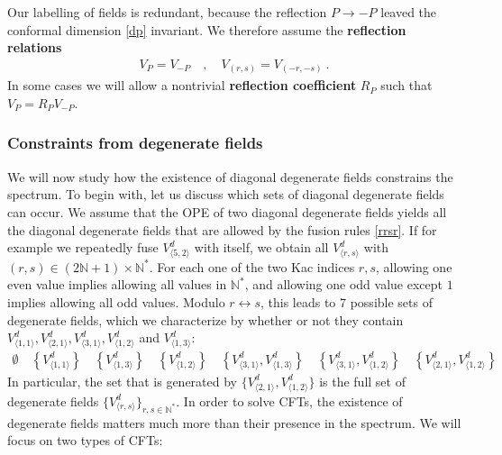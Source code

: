 \documentclass[12pt, a4paper]{article}
\theoremstyle{break}
\begin{document}
Our labelling of fields is redundant, because the reflection $P\to -P$ leaved the conformal dimension \eqref{dp} invariant. We therefore assume the \textbf{reflection relations}
\begin{align}
 V_{P} = V_{-P} \quad , \quad V_{(r,s)} = V_{(-r,-s)} \ . 
 \label{refl}
\end{align}
In some cases we will allow a nontrivial \textbf{reflection coefficient} $R_P$ such that $V_P=R_P V_{-P}$. 


\subsubsection{Constraints from degenerate fields}\label{sec:dotc}

We will now study how the existence of diagonal degenerate fields constrains the spectrum. To begin with, let us discuss which sets of diagonal degenerate fields can occur.
We assume that the OPE of two diagonal degenerate fields yields all the diagonal degenerate fields that are allowed by the fusion rules \eqref{rrsr}. 
If for example we repeatedly fuse $V^d_{\langle 5,2\rangle}$ with itself, we obtain all $V^d_{\langle r,s\rangle}$ with $(r,s)\in (2\mathbb{N}+1)\times \mathbb{N}^*$. For each one of the two Kac indices $r,s$, allowing one even value implies allowing all values in $\mathbb{N}^*$, and allowing one odd value except $1$ implies allowing all odd values. Modulo $r\leftrightarrow s$, this leads to 7 possible sets of degenerate fields, which we characterize by whether or not they contain $V^d_{\langle 1,1\rangle}, V^d_{\langle 2,1\rangle},V^d_{\langle 3,1\rangle},V^d_{\langle 1,2\rangle}$ and $V^d_{\langle 1,3\rangle}$:
\begin{align}
  \emptyset \quad \left\{V^d_{\langle 1,1\rangle}\right\}  \quad \left\{V^d_{\langle 1,3\rangle}\right\} \quad \left\{V^d_{\langle 1,2\rangle}\right\} 
  \quad 
  \left\{V^d_{\langle 3,1\rangle},V^d_{\langle 1,3\rangle}\right\} \quad 
  \left\{V^d_{\langle 3,1\rangle},V^d_{\langle 1,2\rangle}\right\} \quad 
  \left\{V^d_{\langle 2,1\rangle},V^d_{\langle 1,2\rangle}\right\} 
 \label{degsets}
\end{align}
In particular, the set that is generated by $\{V^d_{\langle 2,1\rangle},V^d_{\langle 1,2\rangle}\} $ is the full set of degenerate fields $\{V^d_{\langle r,s\rangle}\}_{r,s\in\mathbb{N}^*}$. 
In order to solve CFTs, the existence of degenerate fields matters much more than their presence in the spectrum. We will focus on two types of CFTs:
\end{document}
